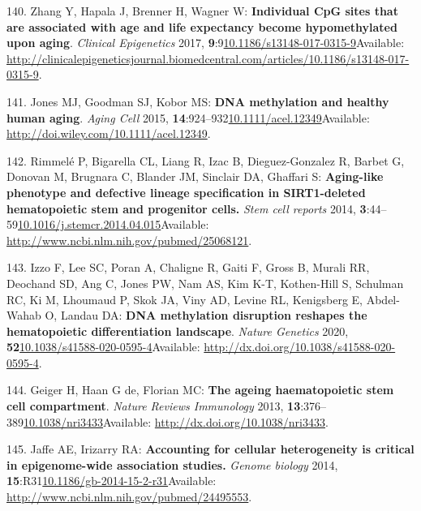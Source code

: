 \documentclass[
]{book}
\begin{document}
\leavevmode\hypertarget{ref-Zhang2017}{}%
140. Zhang Y, Hapala J, Brenner H, Wagner W: \textbf{Individual CpG sites that are associated with age and life expectancy become hypomethylated upon aging}. \emph{Clinical Epigenetics} 2017, \textbf{9}:9\href{https://doi.org/10.1186/s13148-017-0315-9}{10.1186/s13148-017-0315-9}Available: \url{http://clinicalepigeneticsjournal.biomedcentral.com/articles/10.1186/s13148-017-0315-9}.

\leavevmode\hypertarget{ref-Jones2015}{}%
141. Jones MJ, Goodman SJ, Kobor MS: \textbf{DNA methylation and healthy human aging}. \emph{Aging Cell} 2015, \textbf{14}:924--932\href{https://doi.org/10.1111/acel.12349}{10.1111/acel.12349}Available: \url{http://doi.wiley.com/10.1111/acel.12349}.

\leavevmode\hypertarget{ref-Rimmele2014}{}%
142. Rimmelé P, Bigarella CL, Liang R, Izac B, Dieguez-Gonzalez R, Barbet G, Donovan M, Brugnara C, Blander JM, Sinclair DA, Ghaffari S: \textbf{Aging-like phenotype and defective lineage specification in SIRT1-deleted hematopoietic stem and progenitor cells.} \emph{Stem cell reports} 2014, \textbf{3}:44--59\href{https://doi.org/10.1016/j.stemcr.2014.04.015}{10.1016/j.stemcr.2014.04.015}Available: \url{http://www.ncbi.nlm.nih.gov/pubmed/25068121}.

\leavevmode\hypertarget{ref-Izzo2020}{}%
143. Izzo F, Lee SC, Poran A, Chaligne R, Gaiti F, Gross B, Murali RR, Deochand SD, Ang C, Jones PW, Nam AS, Kim K-T, Kothen-Hill S, Schulman RC, Ki M, Lhoumaud P, Skok JA, Viny AD, Levine RL, Kenigsberg E, Abdel-Wahab O, Landau DA: \textbf{DNA methylation disruption reshapes the hematopoietic differentiation landscape}. \emph{Nature Genetics} 2020, \textbf{52}\href{https://doi.org/10.1038/s41588-020-0595-4}{10.1038/s41588-020-0595-4}Available: \url{http://dx.doi.org/10.1038/s41588-020-0595-4}.

\leavevmode\hypertarget{ref-Geiger2013}{}%
144. Geiger H, Haan G de, Florian MC: \textbf{The ageing haematopoietic stem cell compartment}. \emph{Nature Reviews Immunology} 2013, \textbf{13}:376--389\href{https://doi.org/10.1038/nri3433}{10.1038/nri3433}Available: \url{http://dx.doi.org/10.1038/nri3433}.

\leavevmode\hypertarget{ref-Jaffe2014}{}%
145. Jaffe AE, Irizarry RA: \textbf{Accounting for cellular heterogeneity is critical in epigenome-wide association studies.} \emph{Genome biology} 2014, \textbf{15}:R31\href{https://doi.org/10.1186/gb-2014-15-2-r31}{10.1186/gb-2014-15-2-r31}Available: \url{http://www.ncbi.nlm.nih.gov/pubmed/24495553}.
\end{document}
